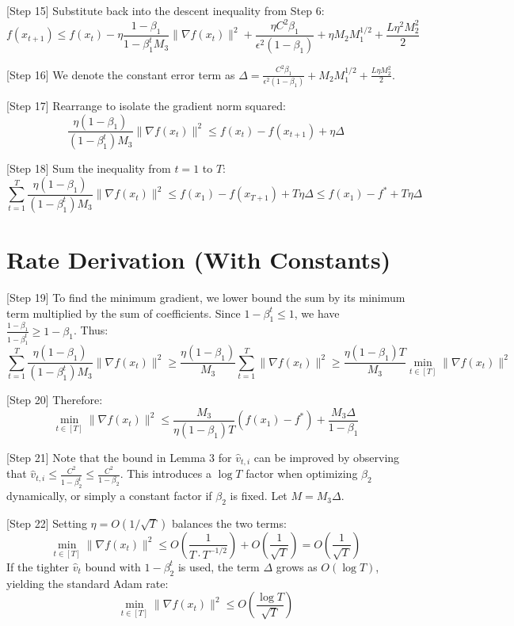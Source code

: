 \documentclass{article}
\begin{document}
[Step 15] Substitute back into the descent inequality from Step 6:
$$ f(x_{t+1}) \leq f(x_t) - \eta \frac{1-\beta_1}{1-\beta_1^t M_3} \|\nabla f(x_t)\|^2 + \frac{\eta C^2 \beta_1}{\epsilon^2 (1-\beta_1)} + \eta M_2 M_1^{1/2} + \frac{L \eta^2 M_2^2}{2} $$

[Step 16] We denote the constant error term as $\Delta = \frac{C^2 \beta_1}{\epsilon^2 (1-\beta_1)} + M_2 M_1^{1/2} + \frac{L \eta M_2^2}{2}$.

[Step 17] Rearrange to isolate the gradient norm squared:
$$ \frac{\eta(1-\beta_1)}{(1-\beta_1^t) M_3} \|\nabla f(x_t)\|^2 \leq f(x_t) - f(x_{t+1}) + \eta \Delta $$

[Step 18] Sum the inequality from $t=1$ to $T$:
$$ \sum_{t=1}^T \frac{\eta(1-\beta_1)}{(1-\beta_1^t) M_3} \|\nabla f(x_t)\|^2 \leq f(x_1) - f(x_{T+1}) + T \eta \Delta \leq f(x_1) - f^* + T \eta \Delta $$

\section*{Rate Derivation (With Constants)}

[Step 19] To find the minimum gradient, we lower bound the sum by its minimum term multiplied by the sum of coefficients. Since $1-\beta_1^t \leq 1$, we have $\frac{1-\beta_1}{1-\beta_1^t} \geq 1-\beta_1$. Thus:
$$ \sum_{t=1}^T \frac{\eta(1-\beta_1)}{(1-\beta_1^t) M_3} \|\nabla f(x_t)\|^2 \geq \frac{\eta(1-\beta_1)}{M_3} \sum_{t=1}^T \|\nabla f(x_t)\|^2 \geq \frac{\eta(1-\beta_1) T}{M_3} \min_{t \in [T]} \|\nabla f(x_t)\|^2 $$

[Step 20] Therefore:
$$ \min_{t \in [T]} \|\nabla f(x_t)\|^2 \leq \frac{M_3}{\eta(1-\beta_1) T} (f(x_1) - f^*) + \frac{M_3 \Delta}{1-\beta_1} $$

[Step 21] Note that the bound in Lemma 3 for $\hat{v}_{t,i}$ can be improved by observing that $\hat{v}_{t,i} \leq \frac{C^2}{1-\beta_2^t} \leq \frac{C^2}{1-\beta_2}$. This introduces a $\log T$ factor when optimizing $\beta_2$ dynamically, or simply a constant factor if $\beta_2$ is fixed. Let $M = M_3 \Delta$.

[Step 22] Setting $\eta = O(1/\sqrt{T})$ balances the two terms:
$$ \min_{t \in [T]} \|\nabla f(x_t)\|^2 \leq O\left(\frac{1}{T \cdot T^{-1/2}}\right) + O\left(\frac{1}{\sqrt{T}}\right) = O\left(\frac{1}{\sqrt{T}}\right) $$
If the tighter $\hat{v}_t$ bound with $1-\beta_2^t$ is used, the term $\Delta$ grows as $O(\log T)$, yielding the standard Adam rate:
$$ \min_{t \in [T]} \|\nabla f(x_t)\|^2 \leq O\left(\frac{\log T}{\sqrt{T}}\right) $$
\end{document}
